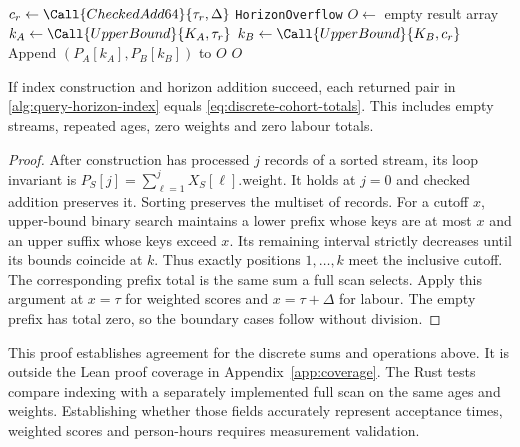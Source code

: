 \begin{algorithm}[tb]
\caption[Query a cohort horizon index]{Return exact totals of weighted scores and labour for a batch of horizons}
\label{alg:query-horizon-index}
\begin{algorithmic}[1]
  \State $c_r\gets\Call{CheckedAdd64}{\tau_r,\Delta}$
    \State \Return \texttt{HorizonOverflow}
  \EndIf
\EndFor
\State $O\gets$ empty result array
  \State $k_A\gets\Call{UpperBound}{K_A,\tau_r}$
  \State $k_B\gets\Call{UpperBound}{K_B,c_r}$
  \State Append $(P_A[k_A],P_B[k_B])$ to $O$
\EndFor
\State \Return $O$
\end{algorithmic}
\end{algorithm}
\endgroup

\begin{proposition}
\label{prop:horizon-index}
If index construction and horizon addition succeed, each returned pair in \autoref{alg:query-horizon-index} equals \eqref{eq:discrete-cohort-totals}. This includes empty streams, repeated ages, zero weights and zero labour totals.
\end{proposition}
\begin{proof}
After construction has processed $j$ records of a sorted stream, its loop invariant is $P_S[j]=\sum_{\ell=1}^{j}X_S[\ell].\mathrm{weight}$. It holds at $j=0$ and checked addition preserves it. Sorting preserves the multiset of records. For a cutoff $x$, upper-bound binary search maintains a lower prefix whose keys are at most $x$ and an upper suffix whose keys exceed $x$. Its remaining interval strictly decreases until its bounds coincide at $k$. Thus exactly positions $1,\ldots,k$ meet the inclusive cutoff. The corresponding prefix total is the same sum a full scan selects. Apply this argument at $x=\tau$ for weighted scores and $x=\tau+\Delta$ for labour. The empty prefix has total zero, so the boundary cases follow without division.
\end{proof}

This proof establishes agreement for the discrete sums and operations above. It is outside the Lean proof coverage in Appendix~\ref{app:coverage}. The Rust tests compare indexing with a separately implemented full scan on the same ages and weights. Establishing whether those fields accurately represent acceptance times, weighted scores and person-hours requires measurement validation.

